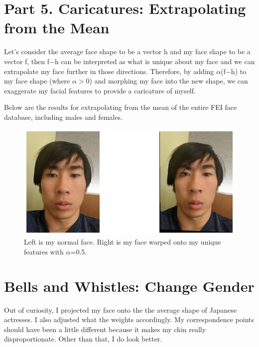 \documentclass{article}
\begin{document}
\section{Part 5. Caricatures: Extrapolating from the Mean}
Let's consider the average face shape to be a vector h and my face shape to be a vector f, then f$-$h can be interpreted as what is unique about my face and we can extrapolate my face further in those directions. Therefore, by adding $\alpha$(f$-$h) to my face shape (where $\alpha>$0) and morphing my face into the new shape, we can exaggerate my facial features to provide a caricature of myself.

Below are the results for extrapolating from the mean of the entire FEI face database, including males and females.

\begin{figure}[!htb]
    \centering
    \includegraphics[scale=0.5]{im9.png}
    \caption{Left is my normal face. Right is my face warped onto my unique features with $\alpha$=0.5.}
\end{figure}
\newpage

\section{Bells and Whistles: Change Gender}
Out of curiosity, I projected my face onto the the average shape of Japanese actresses. I also adjusted what the weights accordingly. My correspondence points should have been a little different because it makes my chin really disproportionate. Other than that, I do look better. 
\end{document}
